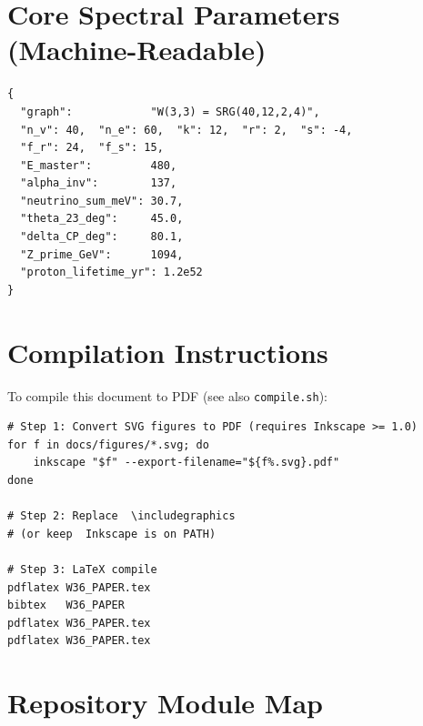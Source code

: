 \documentclass[12pt,a4paper]{article}
\begin{document}
\appendix

\section{Core Spectral Parameters (Machine-Readable)}
\label{app:params}

\begin{verbatim}
{
  "graph":            "W(3,3) = SRG(40,12,2,4)",
  "n_v": 40,  "n_e": 60,  "k": 12,  "r": 2,  "s": -4,
  "f_r": 24,  "f_s": 15,
  "E_master":         480,
  "alpha_inv":        137,
  "neutrino_sum_meV": 30.7,
  "theta_23_deg":     45.0,
  "delta_CP_deg":     80.1,
  "Z_prime_GeV":      1094,
  "proton_lifetime_yr": 1.2e52
}
\end{verbatim}

\section{Compilation Instructions}
\label{app:compile}

To compile this document to PDF (see also \texttt{compile.sh}):
\begin{verbatim}
# Step 1: Convert SVG figures to PDF (requires Inkscape >= 1.0)
for f in docs/figures/*.svg; do
    inkscape "$f" --export-filename="${f%.svg}.pdf"
done

# Step 2: Replace  \includegraphics
# (or keep  Inkscape is on PATH)

# Step 3: LaTeX compile
pdflatex W36_PAPER.tex
bibtex   W36_PAPER
pdflatex W36_PAPER.tex
pdflatex W36_PAPER.tex
\end{verbatim}

\section{Repository Module Map}
\label{app:modules}
\end{document}
